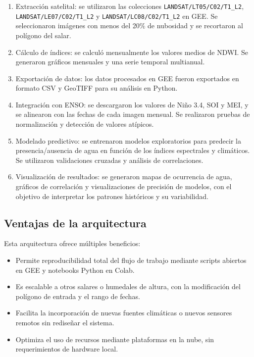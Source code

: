 \begin{enumerate}
    \item Extracción satelital: se utilizaron las colecciones \texttt{LANDSAT/LT05/C02/T1\_L2}, \texttt{LANDSAT/LE07/C02/T1\_L2} y \texttt{LANDSAT/LC08/C02/T1\_L2} en GEE. Se seleccionaron imágenes con menos del 20\% de nubosidad y se recortaron al polígono del salar.

    \item Cálculo de índices: se calculó mensualmente los valores medios de NDWI. Se generaron gráficos mensuales y una serie temporal multianual.

    \item Exportación de datos: los datos procesados en GEE fueron exportados en formato CSV y GeoTIFF para su análisis en Python.

    \item Integración con ENSO: se descargaron los valores de Niño 3.4, SOI y MEI, y se alinearon con las fechas de cada imagen mensual. Se realizaron pruebas de normalización y detección de valores atípicos.

    \item Modelado predictivo: se entrenaron modelos exploratorios para predecir la presencia/ausencia de agua en función de los índices espectrales y climáticos. Se utilizaron validaciones cruzadas y análisis de correlaciones.

    \item Visualización de resultados: se generaron mapas de ocurrencia de agua, gráficos de correlación y visualizaciones de precisión de modelos, con el objetivo de interpretar los patrones históricos y su variabilidad.
\end{enumerate}


\subsection*{Ventajas de la arquitectura}

Esta arquitectura ofrece múltiples beneficios:

\begin{itemize}
    \item Permite reproducibilidad total del flujo de trabajo mediante scripts abiertos en GEE y notebooks Python en Colab.
    \item Es escalable a otros salares o humedales de altura, con la modificación del polígono de entrada y el rango de fechas.
    \item Facilita la incorporación de nuevas fuentes climáticas o nuevos sensores remotos sin rediseñar el sistema.
    \item Optimiza el uso de recursos mediante plataformas en la nube, sin requerimientos de hardware local.
\end{itemize}

